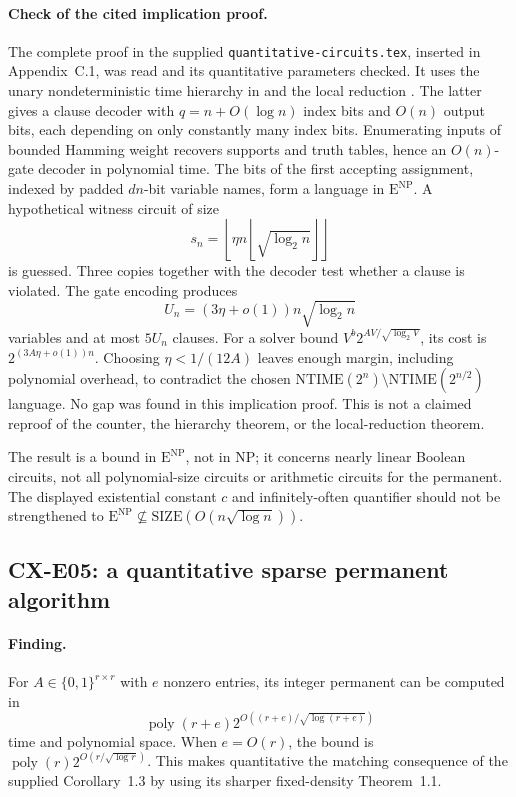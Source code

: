 \paragraph{Check of the cited implication proof.}
The complete proof in the supplied
\nolinkurl{quantitative-circuits.tex}, inserted in Appendix~C.1, was
read and its quantitative parameters checked.
It uses the unary nondeterministic time hierarchy in
\cite[Theorem~2.1]{Williams2013} and the local reduction
\cite[Theorem~1]{JMV2013}.
The latter gives a clause decoder with
\(q=n+O(\log n)\) index bits and \(O(n)\) output bits, each depending
on only constantly many index bits.
Enumerating inputs of bounded Hamming weight recovers supports and
truth tables, hence an \(O(n)\)-gate decoder in polynomial time.
The bits of the first accepting assignment, indexed by padded
\(dn\)-bit variable names, form a language in
\(\mathrm E^{\mathrm{NP}}\).
A hypothetical witness circuit of size
\[
 s_n=\left\lfloor\eta n
          \left\lfloor\sqrt{\log_2 n}\right\rfloor\right\rfloor
\]
is guessed. Three copies together with the decoder test whether a
clause is violated.
The gate encoding produces
\[
 U_n=(3\eta+o(1))n\sqrt{\log_2 n}
\]
variables and at most \(5U_n\) clauses.
For a solver bound \(V^b2^{AV/\sqrt{\log_2 V}}\), its cost is
\(2^{(3A\eta+o(1))n}\).
Choosing \(\eta<1/(12A)\) leaves enough margin, including polynomial
overhead, to contradict the chosen
\(\mathrm{NTIME}(2^n)\setminus\mathrm{NTIME}(2^{n/2})\)
language.
No gap was found in this implication proof.
This is not a claimed reproof of the counter, the hierarchy theorem,
or the local-reduction theorem.

The result is a bound in \(\mathrm E^{\mathrm{NP}}\), not in NP;
it concerns nearly linear Boolean circuits, not all polynomial-size
circuits or arithmetic circuits for the permanent.
The displayed existential constant \(c\) and infinitely-often
quantifier should not be strengthened to
\(\mathrm E^{\mathrm{NP}}\not\subseteq
  \mathrm{SIZE}(O(n\sqrt{\log n}))\).

\subsection{CX-E05: a quantitative sparse permanent algorithm}
\label{finding:CX-E05}

\paragraph{Finding.}
For \(A\in\{0,1\}^{r\times r}\) with \(e\) nonzero entries, its
integer permanent can be computed in
\[
 \operatorname{poly}(r+e)
 2^{O((r+e)/\sqrt{\log(r+e)})}
\]
time and polynomial space.
When \(e=O(r)\), the bound is
\(\operatorname{poly}(r)2^{O(r/\sqrt{\log r})}\).
This makes quantitative the matching consequence of the supplied
Corollary~1.3 by using its sharper fixed-density Theorem~1.1.

